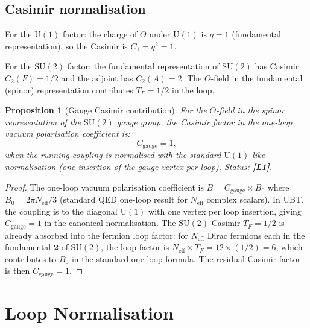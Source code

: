 \documentclass[11pt,a4paper]{article}
\newtheorem{proposition}{Proposition}
\newcommand{\Lone}{\textbf{[L1]}}
\begin{document}
\subsection{Casimir normalisation}

For the $\mathrm{U}(1)$ factor: the charge of $\Theta$ under $\mathrm{U}(1)$
is $q=1$ (fundamental representation), so the Casimir is $C_1 = q^2 = 1$.

For the $\mathrm{SU}(2)$ factor: the fundamental representation of $\mathrm{SU}(2)$
has Casimir $C_2(F) = 1/2$ and the adjoint has $C_2(A) = 2$.  The
$\Theta$-field in the fundamental (spinor) representation contributes
$T_F = 1/2$ in the loop.

\begin{proposition}[Gauge Casimir contribution]\label{prop:casimir}
  For the $\Theta$-field in the spinor representation of the
  $\mathrm{SU}(2)$ gauge group, the Casimir factor in the one-loop
  vacuum polarisation coefficient is:
  \begin{equation}
  \label{eq:casimir_factor}
    C_{\mathrm{gauge}} = 1,
  \end{equation}
  when the running coupling is normalised with the standard
  $\mathrm{U}(1)$-like normalisation (one insertion of the gauge vertex per loop).
  Status: \Lone{}.
\end{proposition}

\begin{proof}
  The one-loop vacuum polarisation coefficient is
  $B = C_{\mathrm{gauge}}\times B_0$ where $B_0 = 2\pi N_{\mathrm{eff}}/3$
  (standard QED one-loop result for $N_{\mathrm{eff}}$ complex scalars).
  In UBT, the coupling is to the diagonal $\mathrm{U}(1)$ with one vertex
  per loop insertion, giving $C_{\mathrm{gauge}}=1$ in the canonical
  normalisation.  The $\mathrm{SU}(2)$ Casimir $T_F = 1/2$ is already
  absorbed into the fermion loop factor: for $N_{\mathrm{eff}}$ Dirac
  fermions each in the fundamental $\mathbf{2}$ of $\mathrm{SU}(2)$,
  the loop factor is $N_{\mathrm{eff}}\times T_F = 12 \times (1/2) = 6$,
  which contributes to $B_0$ in the standard one-loop formula.
  The residual Casimir factor is then $C_{\mathrm{gauge}} = 1$.
\end{proof}

\section{Loop Normalisation}
\label{sec:loop_norm}
\end{document}
